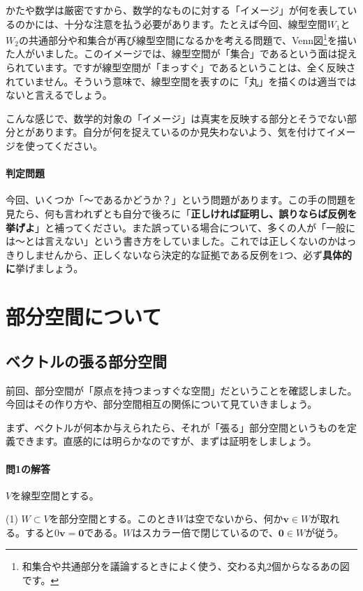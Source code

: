 かたや数学は厳密ですから、数学的なものに対する「イメージ」が何を表しているのかには、十分な注意を払う必要があります。たとえば今回、線型空間$W_1$と$W_2$の共通部分や和集合が再び線型空間になるかを考える問題で、Venn図\footnote{和集合や共通部分を議論するときによく使う、交わる丸$2$個からなるあの図です。}を描いた人がいました。このイメージでは、線型空間が「集合」であるという面は捉えられています。ですが線型空間が「まっすぐ」であるということは、全く反映されていません。そういう意味で、線型空間を表すのに「丸」を描くのは適当ではないと言えるでしょう。

こんな感じで、数学的対象の「イメージ」は真実を反映する部分とそうでない部分とがあります。自分が何を捉えているのか見失わないよう、気を付けてイメージを使ってください。

\paragraph{判定問題}

今回、いくつか「～であるかどうか？」という問題があります。この手の問題を見たら、何も言われずとも自分で後ろに「\textbf{正しければ証明し、誤りならば反例を挙げよ}」と補ってください。また誤っている場合について、多くの人が「一般には～とは言えない」という書き方をしていました。これでは正しくないのかはっきりしませんから、正しくないなら決定的な証拠である反例を$1$つ、必ず\textbf{具体的に}挙げましょう。

\section{部分空間について}

\subsection{ベクトルの張る部分空間}

前回、部分空間が「原点を持つまっすぐな空間」だということを確認しました。今回はその作り方や、部分空間相互の関係について見ていきましょう。

まず、ベクトルが何本か与えられたら、それが「張る」部分空間というものを定義できます。直感的には明らかなのですが、まずは証明をしましょう。

\paragraph{問1の解答} $V$を線型空間とする。

\noindent (1) $W\subset V$を部分空間とする。このとき$W$は空でないから、何か$\bm{v} \in W$が取れる。すると$0\bm{v} = \bm{0}$である。$W$はスカラー倍で閉じているので、$\bm{0}\in W$が従う。

